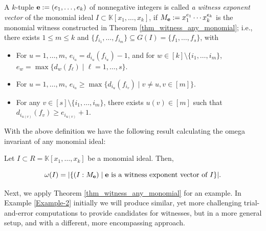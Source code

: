 \documentclass[11pt]{amsart}   %
\begin{document}
\begin{defn}\label{defn_witness_exp} A $k$-tuple ${\bf e}:=(e_1,\ldots,e_k)$ of nonnegative integers is called {\em a witness exponent vector} of the monomial ideal $I\subset\mathbb K[x_1,\ldots,x_k]$, if $M_{\bf e}:=x_1^{e_1}\cdots x_k^{e_k}$ is the monomial witness constructed in Theorem \ref{thm_witness_any_monomial}; i.e., there exists $1\leq m\leq k$ and $\{f_{i_1},\ldots,f_{i_m}\}\subseteq G(I)=\{f_1,\ldots,f_s\}$, with
\begin{itemize}
    \item[(a)] For $u=1,\ldots,m$, $e_{i_u}=d_{i_u}(f_{i_u})-1$, and for $w\in [k]\setminus\{i_1,\ldots,i_m\}$, $e_w=\max\{d_w(f_{\ell})\mid \ell=1,\ldots,s\}$.
    \item[(b)] For $u=1,\ldots, m$, $e_{i_u}\geq\max\{d_{i_u}(f_{i_v})\mid v\neq u, v\in[m]\}$.
    \item[(c)] For any $v\in[s]\setminus\{i_1,\ldots,i_m\}$, there exists $u(v)\in[m]$ such that $d_{i_{u(v)}}(f_v)\geq e_{i_{u(v)}}+1$.
\end{itemize}
\end{defn}

With the above definition we have the following result calculating the omega invariant of any monomial ideal:

\begin{cor}\label{cor_omega_any_monomial} Let $I\subset R=\mathbb K[x_1,\ldots,x_k]$ be a monomial ideal. Then,

$$\omega(I)=|\{(I:M_{\bf e})\mid {\bf e} \mbox{ is a witness exponent vector of } I\}|.$$
    
\end{cor}
\medskip

Next, we apply Theorem \ref{thm_witness_any_monomial} for an example. In Example \ref{Example-2} initially we will produce similar, yet more challenging trial-and-error computations to provide candidates for witnesses, but in a more general setup, and with a different, more encompassing approach.
\end{document}
